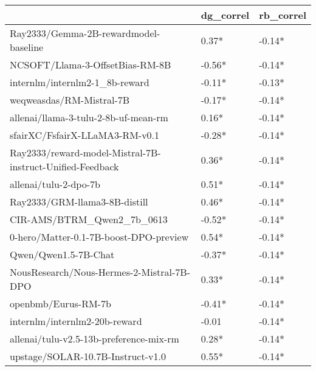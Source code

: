 \begin{tabular}{lll}
\toprule
 & dg\_correl & rb\_correl \\
\midrule
Ray2333/Gemma-2B-rewardmodel-baseline & 0.37* & -0.14* \\
NCSOFT/Llama-3-OffsetBias-RM-8B & -0.56* & -0.14* \\
internlm/internlm2-1\_8b-reward & -0.11* & -0.13* \\
weqweasdas/RM-Mistral-7B & -0.17* & -0.14* \\
allenai/llama-3-tulu-2-8b-uf-mean-rm & 0.16* & -0.14* \\
sfairXC/FsfairX-LLaMA3-RM-v0.1 & -0.28* & -0.14* \\
Ray2333/reward-model-Mistral-7B-instruct-Unified-Feedback & 0.36* & -0.14* \\
allenai/tulu-2-dpo-7b & 0.51* & -0.14* \\
Ray2333/GRM-llama3-8B-distill & 0.46* & -0.14* \\
CIR-AMS/BTRM\_Qwen2\_7b\_0613 & -0.52* & -0.14* \\
0-hero/Matter-0.1-7B-boost-DPO-preview & 0.54* & -0.14* \\
Qwen/Qwen1.5-7B-Chat & -0.37* & -0.14* \\
NousResearch/Nous-Hermes-2-Mistral-7B-DPO & 0.33* & -0.14* \\
openbmb/Eurus-RM-7b & -0.41* & -0.14* \\
internlm/internlm2-20b-reward & -0.01 & -0.14* \\
allenai/tulu-v2.5-13b-preference-mix-rm & 0.28* & -0.14* \\
upstage/SOLAR-10.7B-Instruct-v1.0 & 0.55* & -0.14* \\
\bottomrule
\end{tabular}

